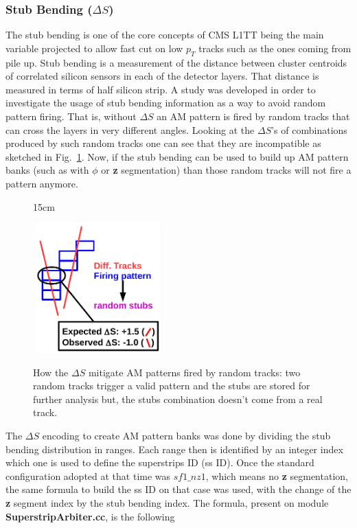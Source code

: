 \subsubsection{Stub Bending ($\Delta S$) \label{sec:stub_bending_approach}}
The stub bending is one of the core concepts of CMS L1TT being the main variable projected to allow fast cut on low $p_{T}$ tracks such as the ones coming from pile up. Stub bending is a measurement of the distance between cluster centroids of correlated silicon sensors in each of the detector layers. That distance is measured in terms of half silicon strip. A study was developed in order to investigate the usage of stub bending information as a way to avoid random pattern firing. That is, without $\Delta S$ an AM pattern is fired by random tracks that can cross the layers in very different angles. Looking at the $\Delta S$'s of combinations produced by such random tracks one can see that they are incompatible as sketched in Fig.~\ref{fig:deltaS_workway}. Now, if the stub bending can be used to build up AM pattern banks (such as with \textbf{$\phi$} or \textbf{z} segmentation) than those random tracks will not fire a pattern anymore.

\begin{figure}[htbp]{15cm}
	\caption{How the $\Delta S$ mitigate AM patterns fired by random tracks: two random tracks trigger a valid pattern and the stubs are stored for further analysis but, the stubs combination doesn't come from a real track.}
	\centering
	\includegraphics[width=5cm,height=5cm]{AppendixCMSL1TT/figs/deltaS_workway}
	\label{fig:deltaS_workway}
\end{figure}

The $\Delta S$ encoding to create AM pattern banks was done by dividing the stub bending distribution in ranges. Each range then is identified by an integer index which one is used to define the superstrips ID (ss ID). Once the standard configuration adopted at that time was $sf1\_nz1$, which means no \textbf{z} segmentation, the same formula to build the ss ID on that case was used, with the change of the \textbf{z} segment index by the stub bending index. The formula, present on module \textbf{SuperstripArbiter.cc}, is the following


